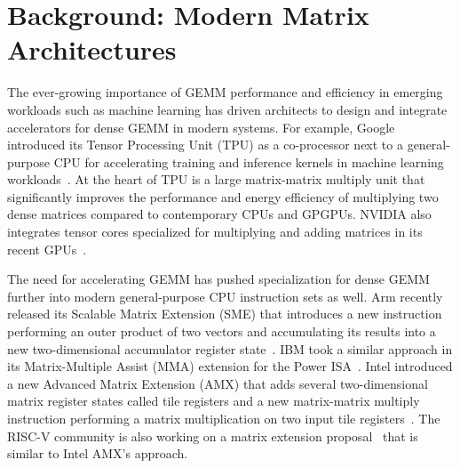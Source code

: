 
\section{Background: Modern Matrix Architectures}
\label{sec-spz-mtx-ext-background}



The ever-growing importance of GEMM performance and efficiency in emerging
workloads such as machine learning has driven architects to design and
integrate accelerators for dense GEMM in modern systems.
For example, Google introduced its Tensor Processing Unit (TPU) as a
co-processor next to a general-purpose CPU for accelerating training and
inference kernels in machine learning
workloads~\cite{jouppi-datacenter-isca2017,teich-google-tpu-v2-blog2018,jouppi-google-tpu-v2-v3-cacm2020,jouppi-tpu-v4-isca2023}.
At the heart of TPU is a large matrix-matrix multiply unit that significantly
improves the performance and energy efficiency of multiplying two dense
matrices compared to contemporary CPUs and GPGPUs.
NVIDIA also integrates tensor cores specialized for multiplying and adding
matrices in its recent GPUs~\cite{choquette-nvidia-tensor-core-2021}.

The need for accelerating GEMM has pushed specialization for dense GEMM further
into modern general-purpose CPU instruction sets as well.
Arm recently released its Scalable Matrix Extension (SME) that introduces a new
instruction performing an outer product of two vectors and accumulating its
results into a new two-dimensional accumulator register
state~\cite{arm-sme-web}.
IBM took a similar approach in its Matrix-Multiple Assist (MMA) extension for
the Power ISA~\cite{ibm-mmx-assist-web}.
Intel introduced a new Advanced Matrix Extension (AMX) that adds several
two-dimensional matrix register states called tile registers and a new
matrix-matrix multiply instruction performing a matrix multiplication on two
input tile registers~\cite{intel-amx-web,nassif-intel-sapphire-isscc2022}.
The RISC-V community is also working on a matrix extension
proposal~\cite{riscv-mtx-ext-proposal-web} that is similar to Intel AMX's
approach.

